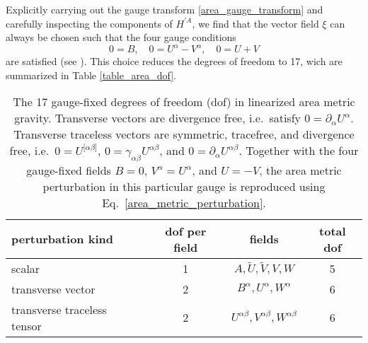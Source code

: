 Explicitly carrying out the gauge transform \eqref{area_gauge_transform} and carefully inspecting the components of $H^{\prime A}$, we find that the vector field $\xi$ can always be chosen such that the four gauge conditions
\begin{equation}
  0 = B,\quad 0 = U^\alpha - V^\alpha,\quad 0 = U + V
\end{equation}
are satisfied (see \cite{perturbation_paper}). This choice reduces the degrees of freedom to 17, wich are summarized in Table \ref{table_area_dof}.
\begin{table}
  \centering
  \begin{tabular}{l c c c}
    \toprule
    perturbation kind & dof per field & fields & total dof \\
    \midrule
    scalar & 1 & $A,\tilde U,\tilde V,V,W$ & 5 \\
    transverse vector & 2 & $B^\alpha,U^\alpha,W^\alpha$ & 6 \\
    transverse traceless tensor & 2 & $U^{\alpha\beta},V^{\alpha\beta},W^{\alpha\beta}$ & 6 \\
    \bottomrule 
  \end{tabular}
  \caption{The 17 gauge-fixed degrees of freedom (dof) in linearized area metric gravity. Transverse vectors are divergence free, i.e.~satisfy $0 = \partial_\alpha U^\alpha$. Transverse traceless vectors are symmetric, tracefree, and divergence free, i.e.~$0 = U^{\lbrack\alpha\beta\rbrack}$, $0 = \gamma_{\alpha\beta} U^{\alpha\beta}$, and $0 = \partial_\alpha U^{\alpha\beta}$. Together with the four gauge-fixed fields $B=0$, $V^\alpha = U^\alpha$, and $U=-V$, the area metric perturbation in this particular gauge is reproduced using Eq.~\eqref{area_metric_perturbation}.}
\end{table}

